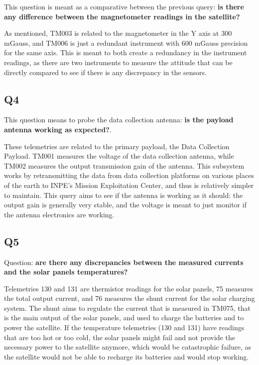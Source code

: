 This question is meant as a comparative between the previous query: \textbf{is there any difference between the magnetometer readings in the satellite?}

As mentioned, TM003 is related to the magnetometer in the Y axis at 300 mGauss, and TM006 is just a redundant instrument with 600 mGauss precision for the same axis.
This is meant to both create a redundancy in the instrument readings, as there are two instruments to measure the attitude that can be directly compared to see if there is any discrepancy in the sensors.

\subsection{Q4}\label{q4}

This question means to probe the data collection antenna: \textbf{is the payload antenna working as expected?}.

These telemetries are related to the primary payload, the Data Collection Payload.
TM001 measures the voltage of the data collection antenna, while TM002 measures the output transmission gain of the antenna.
This subsystem works by retransmitting the data from data collection platforms on various places of the earth to INPE's Mission Exploitation Center, and thus is relatively simpler to maintain.
This query aims to see if the antenna is working as it should: the output gain is generally very stable, and the voltage is meant to just monitor if the antenna electronics are working.

\subsection{Q5}\label{q5}

Question: \textbf{are there any discrepancies between the measured currents and the solar panels temperatures?}

Telemetries 130 and 131 are thermistor readings for the solar panels, 75 measures the total output current, and 76 measures the shunt current for the solar charging system.
The shunt aims to regulate the current that is measured in TM075, that is the main output of the solar panels, and used to charge the batteries and to power the satellite.
If the temperature telemetries (130 and 131) have readings that are too hot or too cold, the solar panels might fail and not provide the necessary power to the satellite anymore, which would be catastrophic failure, as the satellite would not be able to recharge its batteries and would stop working.

